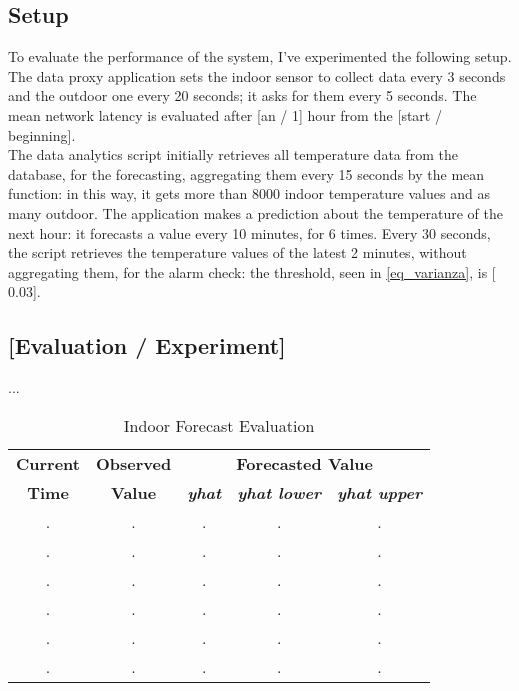 \documentclass[conference]{IEEEtran}
\begin{document}
\subsection{Setup}
To evaluate the performance of the system, I've experimented the following setup.\\
The data proxy application sets the indoor sensor to collect data every 3 seconds and the outdoor one every 20 seconds; it asks for them every 5 seconds. The mean network latency is evaluated after [an / 1] hour from the [start / beginning].\\
The data analytics script initially retrieves all temperature data from the database, for the forecasting, aggregating them every 15 seconds by the mean function: in this way, it gets more than 8000 indoor temperature values and as many outdoor. The application makes a prediction about the temperature of the next hour: it forecasts a value every 10 minutes, for 6 times. Every 30 seconds, the script retrieves the temperature values of the latest 2 minutes, without aggregating them, for the alarm check: the threshold, seen in \eqref{eq_varianza}, is [$0.03$].

\subsection{[Evaluation / Experiment]}
...

\begin{table}[htbp]
\caption{Indoor Forecast Evaluation}
\begin{center}
\begin{tabular}{|c|c|c|c|c|}
\hline
\textbf{Current} & \textbf{Observed} & \multicolumn{3}{|c|}{\textbf{Forecasted Value}} \\
\cline{3-5}
\textbf{Time} & \textbf{Value} & \textbf{\textit{yhat}} & \textbf{\textit{yhat lower}} & \textbf{\textit{yhat upper}} \\
\hline
. & . & . & . & . \\
\hline
. & . & . & . & . \\
\hline
. & . & . & . & . \\
\hline
. & . & . & . & . \\
\hline
. & . & . & . & . \\
\hline
. & . & . & . & . \\
\hline
\end{tabular}
\label{tab_forecast_indoor}
\end{center}
\end{table}
\end{document}
